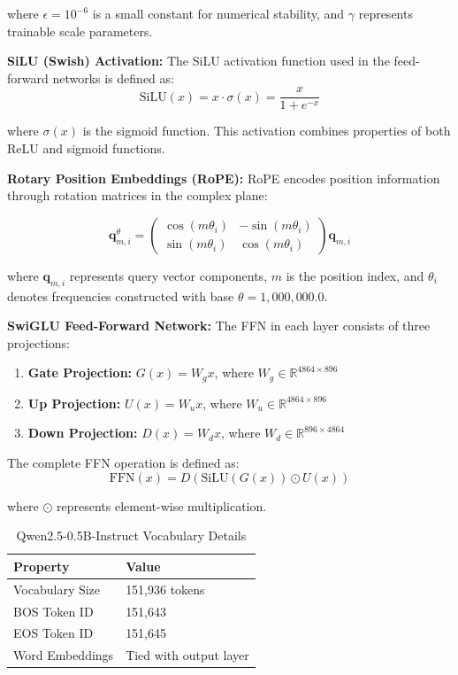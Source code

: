 \documentclass{article}
\begin{document}
\noindent where $\epsilon = 10^{-6}$ is a small constant for numerical stability, and $\gamma$ represents trainable scale parameters.

\textbf{SiLU (Swish) Activation:} The SiLU activation function used in the feed-forward networks is defined as:
\begin{equation}
\text{SiLU}(x) = x \cdot \sigma(x) = \frac{x}{1 + e^{-x}}
\end{equation}

\noindent where $\sigma(x)$ is the sigmoid function. This activation combines properties of both ReLU and sigmoid functions.

\textbf{Rotary Position Embeddings (RoPE):} RoPE\cite{su2024roformer} encodes position information through rotation matrices in the complex plane:

\begin{equation}
\mathbf{q}_{m,i}^{\theta} = \begin{pmatrix} \cos(m\theta_i) & -\sin(m\theta_i) \\ \sin(m\theta_i) & \cos(m\theta_i) \end{pmatrix} \mathbf{q}_{m,i}
\end{equation}

\noindent where $\mathbf{q}_{m,i}$ represents query vector components, $m$ is the position index, and $\theta_i$ denotes frequencies constructed with base $\theta = 1,000,000.0$.

\textbf{SwiGLU Feed-Forward Network:} The FFN in each layer consists of three projections:

\begin{enumerate}
\item \textbf{Gate Projection:} $G(x) = W_g x$, where $W_g \in \mathbb{R}^{4864 \times 896}$
\item \textbf{Up Projection:} $U(x) = W_u x$, where $W_u \in \mathbb{R}^{4864 \times 896}$
\item \textbf{Down Projection:} $D(x) = W_d x$, where $W_d \in \mathbb{R}^{896 \times 4864}$
\end{enumerate}

The complete FFN operation is defined as:
\begin{equation}
\text{FFN}(x) = D(\text{SiLU}(G(x)) \odot U(x))
\end{equation}

\noindent where $\odot$ represents element-wise multiplication.

\begin{table}[H]
\centering
\begin{tabular}{@{}ll@{}}
\hline
\textbf{Property} & \textbf{Value} \\
\hline
Vocabulary Size & 151,936 tokens \\
BOS Token ID & 151,643 \\
EOS Token ID & 151,645 \\
Word Embeddings & Tied with output layer \\
\hline
\end{tabular}
\caption{Qwen2.5-0.5B-Instruct Vocabulary Details}
\label{tab:qwen25-vocab}
\end{table}
\end{document}
